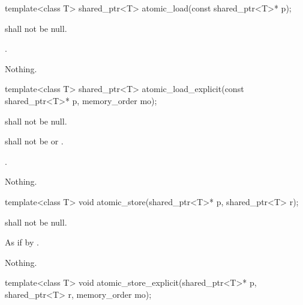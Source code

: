 %
%
\begin{itemdecl}
template<class T>
  shared_ptr<T> atomic_load(const shared_ptr<T>* p);
\end{itemdecl}

\begin{itemdescr}
\pnum
\requires {} shall not be null.

\pnum
\returns {}.

\pnum
\throws Nothing.
\end{itemdescr}

%
%
\begin{itemdecl}
template<class T>
  shared_ptr<T> atomic_load_explicit(const shared_ptr<T>* p, memory_order mo);
\end{itemdecl}

\begin{itemdescr}
\pnum
\requires {} shall not be null.

\pnum
\requires {} shall not be  or .

\pnum
\returns {}.

\pnum
\throws Nothing.
\end{itemdescr}

%
%
\begin{itemdecl}
template<class T>
  void atomic_store(shared_ptr<T>* p, shared_ptr<T> r);
\end{itemdecl}

\begin{itemdescr}
\pnum
\requires {} shall not be null.

\pnum
\effects As if by .

\pnum
\throws Nothing.
\end{itemdescr}

%
%
\begin{itemdecl}
template<class T>
  void atomic_store_explicit(shared_ptr<T>* p, shared_ptr<T> r, memory_order mo);
\end{itemdecl}

